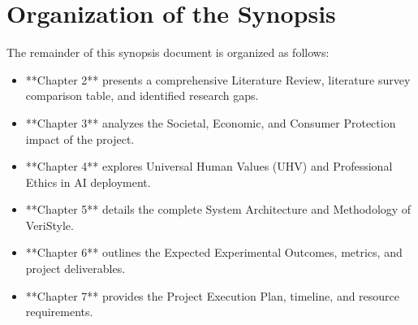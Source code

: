 \section{Organization of the Synopsis}
The remainder of this synopsis document is organized as follows:
\begin{itemize}
    \item **Chapter 2** presents a comprehensive Literature Review, literature survey comparison table, and identified research gaps.
    \item **Chapter 3** analyzes the Societal, Economic, and Consumer Protection impact of the project.
    \item **Chapter 4** explores Universal Human Values (UHV) and Professional Ethics in AI deployment.
    \item **Chapter 5** details the complete System Architecture and Methodology of VeriStyle.
    \item **Chapter 6** outlines the Expected Experimental Outcomes, metrics, and project deliverables.
    \item **Chapter 7** provides the Project Execution Plan, timeline, and resource requirements.
\end{itemize}
